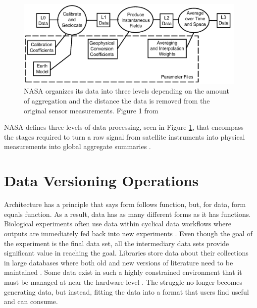 \begin{figure}
	\centering
	\includegraphics[scale=0.40]{figures/NASALevels.png}
	\caption{NASA organizes its data into three levels depending on the amount of aggregation and the distance the data is removed from the original sensor measurements. Figure 1 from \cite{Barkstrom2003}}
	\label{NASALevels}
\end{figure}

NASA defines three levels of data processing, seen in Figure \ref{NASALevels}, that encompass the stages required to turn a raw signal from satellite instruments into physical measurements into global aggregate summaries \cite{Barkstrom2003}.

\section{Data Versioning Operations}

Architecture has a principle that says form follows function, but, for data, form equals function.
As a result, data has as many different forms as it has functions.
Biological experiments often use data within cyclical data workflows where outputs are immediately fed back into new experiments \cite{Tagger2005}.
Even though the goal of the experiment is the final data set, all the intermediary data sets provide significant value in reaching the goal.
Libraries store data about their collections in large databases where both old and new versions of literature need to be maintained \cite{Wiil:2000:RDH:338407.338517}.
Some data exist in such a highly constrained environment that it must be managed at near the hardware level \cite{Flouris04clotho:transparent}.
The struggle no longer becomes generating data, but instead, fitting the data into a format that users find useful and can consume.

